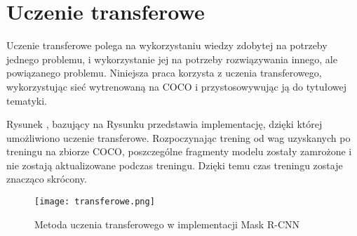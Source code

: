 \newpage
\section{Uczenie transferowe}
\label{sec:uczenie-transferowe}

Uczenie transferowe polega na wykorzystaniu wiedzy zdobytej na potrzeby jednego problemu, i wykorzystanie jej na potrzeby rozwiązywania innego, ale powiązanego problemu.
Niniejsza praca korzysta z uczenia transferowego, wykorzystując sieć wytrenowaną na COCO i przystosowywując ją do tytułowej tematyki.

Rysunek , bazujący na Rysunku  przedstawia implementację, dzięki której umożliwiono uczenie transferowe. Rozpoczynając trening od wag uzyskanych po treningu na zbiorze COCO, poszczególne fragmenty modelu zostały zamrożone i nie zostają aktualizowane podczas treningu. Dzięki temu czas treningu zostaje znacząco skrócony.

\begin{figure}[h]
  \centering
  \caption{Metoda uczenia transferowego w implementacji Mask R-CNN}
  \texttt{[image: transferowe.png]}
  \label{fig:transferowe}
\end{figure}
